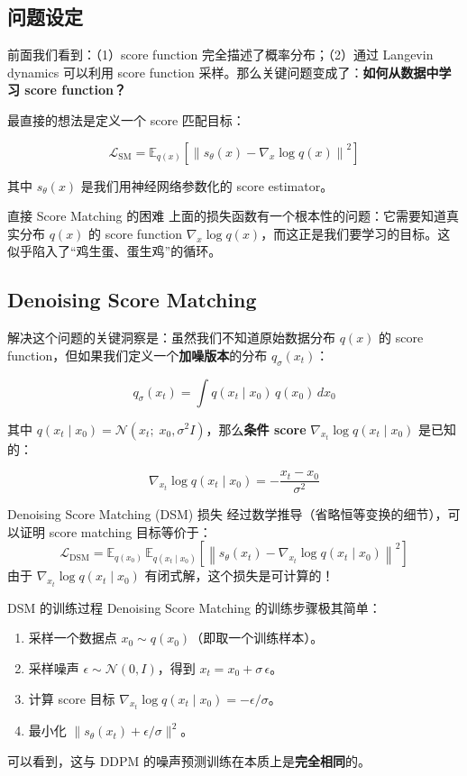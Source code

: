 \documentclass[a4paper]{article}
\begin{document}
\subsection{问题设定}

前面我们看到：（1）score function 完全描述了概率分布；（2）通过 Langevin dynamics 可以利用 score function 采样。那么关键问题变成了：\textbf{如何从数据中学习 score function？}

最直接的想法是定义一个 score 匹配目标：

$$\mathcal{L}_{\text{SM}} = \mathbb{E}_{q(x)}\left[\left\| s_\theta(x) - \nabla_x \log q(x) \right\|^2\right]$$

其中 $s_\theta(x)$ 是我们用神经网络参数化的 score estimator。

\begin{warningbox}{直接 Score Matching 的困难}
上面的损失函数有一个根本性的问题：它需要知道真实分布 $q(x)$ 的 score function $\nabla_x \log q(x)$，而这正是我们要学习的目标。这似乎陷入了``鸡生蛋、蛋生鸡''的循环。
\end{warningbox}

\subsection{Denoising Score Matching}

解决这个问题的关键洞察是：虽然我们不知道原始数据分布 $q(x)$ 的 score function，但如果我们定义一个\textbf{加噪版本}的分布 $q_\sigma(x_t)$：

$$q_\sigma(x_t) = \int q(x_t \mid x_0)\, q(x_0)\, dx_0$$

其中 $q(x_t \mid x_0) = \mathcal{N}(x_t;\; x_0, \sigma^2 I)$，那么\textbf{条件 score} $\nabla_{x_t} \log q(x_t \mid x_0)$ 是已知的：

$$\nabla_{x_t} \log q(x_t \mid x_0) = -\frac{x_t - x_0}{\sigma^2}$$

\begin{importantbox}{Denoising Score Matching (DSM) 损失}
经过数学推导（省略恒等变换的细节），可以证明 score matching 目标等价于：
$$\mathcal{L}_{\text{DSM}} = \mathbb{E}_{q(x_0)}\, \mathbb{E}_{q(x_t \mid x_0)}\left[\left\| s_\theta(x_t) - \nabla_{x_t} \log q(x_t \mid x_0) \right\|^2\right]$$
由于 $\nabla_{x_t} \log q(x_t \mid x_0)$ 有闭式解，这个损失是可计算的！
\end{importantbox}

\begin{knowledgebox}{DSM 的训练过程}
Denoising Score Matching 的训练步骤极其简单：
\begin{enumerate}
    \item 采样一个数据点 $x_0 \sim q(x_0)$（即取一个训练样本）。
    \item 采样噪声 $\epsilon \sim \mathcal{N}(0, I)$，得到 $x_t = x_0 + \sigma\, \epsilon$。
    \item 计算 score 目标 $\nabla_{x_t} \log q(x_t \mid x_0) = -\epsilon / \sigma$。
    \item 最小化 $\|s_\theta(x_t) + \epsilon/\sigma\|^2$。
\end{enumerate}
可以看到，这与 DDPM 的噪声预测训练在本质上是\textbf{完全相同}的。
\end{knowledgebox}
\end{document}
